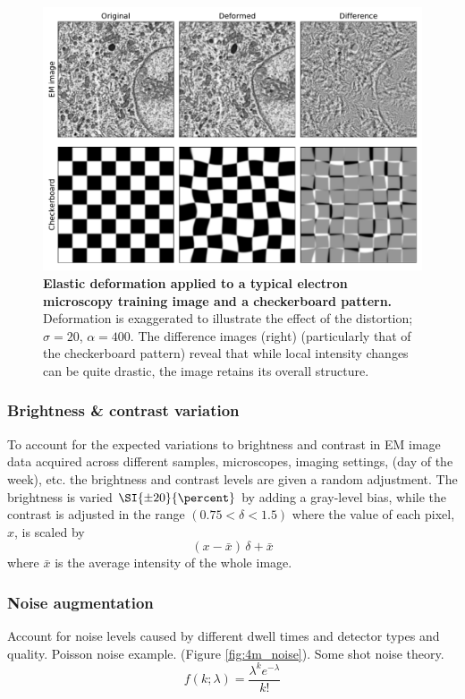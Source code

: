 \begin{figure}[!tbh]
    \centering
    \includegraphics[width=0.9\linewidth]{chapter-4/mfigs/mfig_example.pdf}
    \caption{\textbf{Elastic deformation applied to a typical electron microscopy training image and a checkerboard pattern.}
    Deformation is exaggerated to illustrate the effect of the distortion; $\sigma=20$, $\alpha=400$. The difference images (right) (particularly that of the checkerboard pattern) reveal that while local intensity changes can be quite drastic, the image retains its overall structure.}
    \label{fig:4m_elastic}
\end{figure}

\subsubsection{Brightness \& contrast variation}
To account for the expected variations to brightness and contrast in EM image data acquired across different samples, microscopes, imaging settings, (day of the week), etc. the brightness and contrast levels are given a random adjustment. The brightness is varied $\SI{\pm20}{\percent}$ by adding a gray-level bias, while the contrast is adjusted in the range $(0.75 < \delta < 1.5)$ where the value of each pixel, $x$, is scaled by
%
\begin{equation}
    (x - \bar{x})\,\delta + \bar{x}
\end{equation}
%
where $\bar{x}$ is the average intensity of the whole image.

\subsubsection{Noise augmentation}
Account for noise levels caused by different dwell times and detector types and quality. Poisson noise example. (Figure \ref{fig:4m_noise}). Some shot noise theory.
%
\begin{equation}
    f(k;\lambda) = \frac{\lambda^{k} e^{-\lambda}}{k!}
\end{equation}

